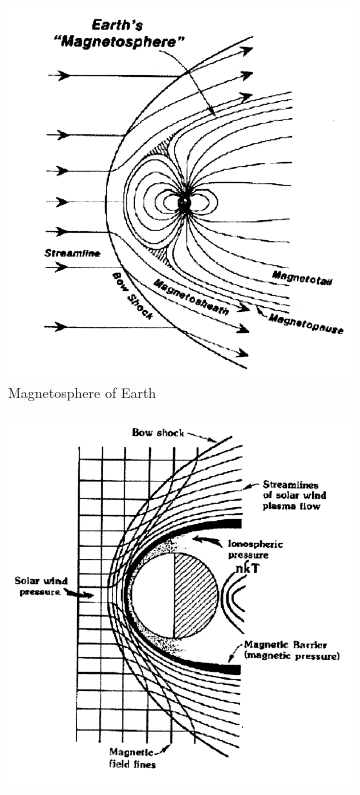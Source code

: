 \begin{figure}
\centering
\begin{subfigure}{.5\textwidth}
    \centering
    \includegraphics[width=\linewidth]{figures/ReferenceFigures/EarthMagnetosphere.PNG}
    \caption{Magnetosphere of Earth}
    \label{fig:EarthMagSph}
\end{subfigure}%
\begin{subfigure}{.5\textwidth}
    \centering
    \includegraphics[width=\linewidth]{figures/ReferenceFigures/inducedMagnetosphere.PNG}

\end{subfigure}
\end{figure}
